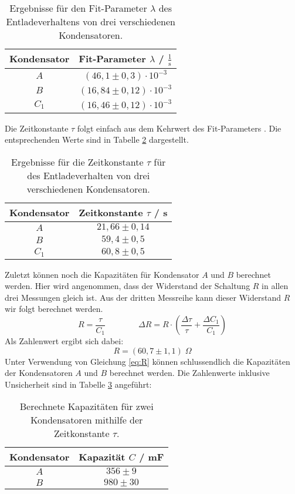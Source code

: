 \documentclass{article}
\begin{document}
\begin{table}[h]
    \centering
    \caption{Ergebnisse für den Fit-Parameter $\lambda$ des Entladeverhaltens von drei verschiedenen Kondensatoren.}
    \label{tab:Lambda}
    \begin{tabular}{c|c}
    Kondensator & Fit-Parameter $\lambda$ / $\frac{1}{\text{s}}$ \\\hline
    $A$ & $(46{,}1 \pm 0{,}3) \cdot 10^{-3}$ \\
    $B$ & $(16{,}84 \pm 0{,}12) \cdot 10^{-3}$  \\
    $C_1$ & $(16{,}46 \pm 0{,}12) \cdot 10^{-3}$ \\
    \end{tabular}
\end{table}

\noindent Die Zeitkonstante $\tau$ folgt einfach aus dem Kehrwert des Fit-Parameters \cite{Zeitkonstante}. Die entsprechenden Werte sind in Tabelle \ref{tab:Tau} dargestellt.
\begin{table}[h]
    \centering
    \caption{Ergebnisse für die Zeitkonstante $\tau$ für des Entladeverhalten von drei verschiedenen Kondensatoren.}
    \label{tab:Tau}
    \begin{tabular}{c|c}
    Kondensator & Zeitkonstante $\tau$ / s \\\hline
    $A$ & $21{,}66 \pm 0{,}14 $ \\
    $B$ & $59{,}4 \pm 0{,}5$ \\
    $C_1$ & $60{,}8 \pm 0{,}5$ \\
    \end{tabular}
\end{table}

\noindent Zuletzt können noch die Kapazitäten für Kondensator $A$ und $B$ berechnet werden. Hier wird angenommen, dass der Widerstand der Schaltung $R$ in allen drei Messungen gleich ist. Aus der dritten Messreihe kann dieser Widerstand $R$ wir folgt berechnet werden\cite{Zeitkonstante}.
\begin{equation}\label{eq:R}
    R = \frac{\tau}{C_1} \qquad \qquad \Delta R = R \cdot \left( \frac{\Delta\tau}{\tau} + \frac{\Delta C_1}{C_1} \right)
\end{equation}
Als Zahlenwert ergibt sich dabei:
$$R = (60{,}7 \pm 1{,}1) \; \Omega$$
Unter Verwendung von Gleichung \ref{eq:R} können schlussendlich die Kapazitäten der Kondensatoren $A$ und $B$ berechnet werden. Die Zahlenwerte inklusive Unsicherheit sind in Tabelle \ref{tab:Capa} angeführt:
\begin{table}[h]
    \centering
    \caption{Berechnete Kapazitäten für zwei Kondensatoren mithilfe der Zeitkonstante $\tau$.}
    \label{tab:Capa}
    \begin{tabular}{c|c}
    Kondensator & Kapazität $C$ / mF \\\hline
    $A$ & $356 \pm 9 $ \\
    $B$ & $980 \pm 30$ \\
    \end{tabular}
\end{table}
\end{document}
